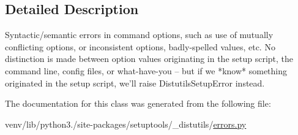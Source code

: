 \subsection{Detailed Description}
\begin{DoxyVerb}Syntactic/semantic errors in command options, such as use of
mutually conflicting options, or inconsistent options,
badly-spelled values, etc.  No distinction is made between option
values originating in the setup script, the command line, config
files, or what-have-you -- but if we *know* something originated in
the setup script, we'll raise DistutilsSetupError instead.\end{DoxyVerb}
 

The documentation for this class was generated from the following file\+:\begin{DoxyCompactItemize}
\item 
venv/lib/python3./site-\/packages/setuptools/\+\_\+distutils/\hyperlink{__distutils_2errors_8py}{errors.\+py}\end{DoxyCompactItemize}
